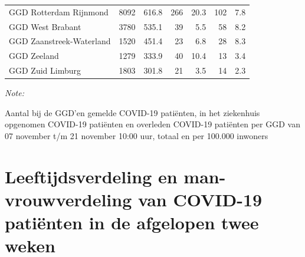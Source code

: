 \documentclass[
  english,
  man,floatsintext]{apa6}
\begin{document}
\begin{table}[H]
\begin{threeparttable}
\begin{tabular}{lrrrrrr}
GGD Rotterdam Rijnmond & 8092 & 616.8 & 266 & 20.3 & 102 & 7.8\\
GGD West Brabant & 3780 & 535.1 & 39 & 5.5 & 58 & 8.2\\
GGD Zaanstreek-Waterland & 1520 & 451.4 & 23 & 6.8 & 28 & 8.3\\
GGD Zeeland & 1279 & 333.9 & 40 & 10.4 & 13 & 3.4\\
GGD Zuid Limburg & 1803 & 301.8 & 21 & 3.5 & 14 & 2.3\\
\bottomrule
\end{tabular}
\begin{tablenotes}
\item \textit{Note: } 
\item Aantal bij de GGD’en gemelde COVID-19 patiënten, in het ziekenhuis opgenomen COVID-19 patiënten en overleden COVID-19 patiënten per GGD van 07 november t/m 21 november 10:00 uur, totaal en per 100.000 inwoners
\end{tablenotes}
\end{threeparttable}
\endgroup{}
\end{table}

\newpage

\hypertarget{leeftijdsverdeling-en-man-vrouwverdeling-van-covid-19-patiuxebnten-in-de-afgelopen-twee-weken}{%
\section{Leeftijdsverdeling en man-vrouwverdeling van COVID-19 patiënten in de afgelopen twee weken}\label{leeftijdsverdeling-en-man-vrouwverdeling-van-covid-19-patiuxebnten-in-de-afgelopen-twee-weken}}
\end{document}
